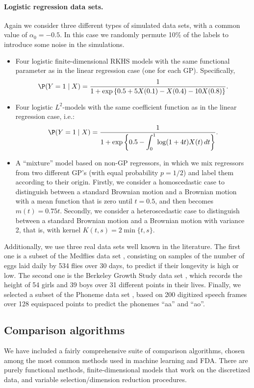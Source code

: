 \paragraph{Logistic regression data sets.} Again we consider three different types of simulated data sets,  with a common value of \(\alpha_0=-0.5\). In this case we randomly permute 10\% of the labels to introduce some noise in the simulations.
\begin{itemize}
  \item Four logistic finite-dimensional RKHS models with the same functional parameter as in the linear regression case (one for each GP). Specifically,
  \[
  \P(Y=1\mid X) = \frac{1}{1 + \exp\left\{0.5 +5X(0.1) - X(0.4) - 10X(0.8)\right\}}.
  \]
  \item Four logistic \(L^2\)-models with the same coefficient function as in the linear regression case, i.e.:
  \[
  \P(Y=1\mid X) = \frac{1}{\displaystyle 1 + \exp\left\{0.5 - \int_0^1 \log(1+4t) X(t)\, dt\right\}}.
  \]
  \item A ``mixture'' model based on non-GP regressors, in which we mix regressors from two different GP's (with equal probability \(p=1/2\)) and label them according to their origin. Firstly, we consider a homoscedastic case to distinguish between a standard Brownian motion and a Brownian motion with a mean function that is zero until \(t=0.5\), and then becomes \(m(t)=0.75t\). Secondly, we consider a heteroscedastic case to distinguish between a standard Brownian motion and a Brownian motion with variance 2, that is, with kernel \(K(t,s)=2\min\{t,s\}\).
\end{itemize}
Additionally, we use three real data sets well known in the literature. The first one is a subset of the Medflies data set \citep{carey1998relationship}, consisting on samples of the number of eggs laid daily by 534 flies over 30 days, to predict if their longevity is high or low. The second one is the Berkeley Growth Study data set \citep{tuddenham1954physical}, which records the height of 54 girls and 39 boys over 31 different points in their lives. Finally, we selected a subset of the Phoneme data set \citep{hastie1995penalized}, based on 200 digitized speech frames over 128 equispaced points to predict the phonemes ``aa'' and ``ao''.

\subsection*{Comparison algorithms}

We have included a fairly comprehensive suite of comparison algorithms, chosen among the most common methods used in machine learning and FDA. There are purely functional methods, finite-dimensional models that work on the discretized data, and variable selection/dimension reduction procedures.

